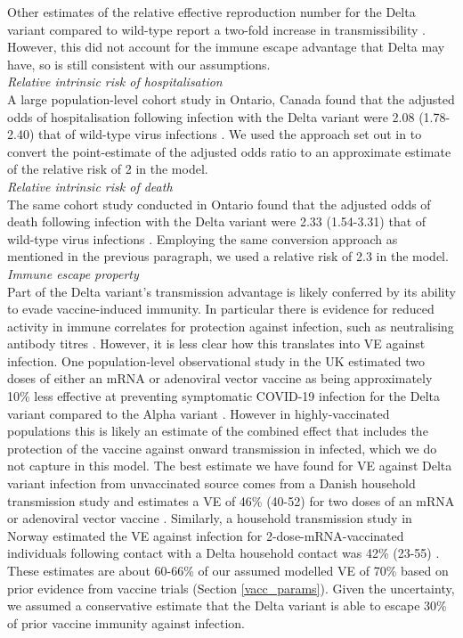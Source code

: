Other estimates of the relative effective reproduction number for the Delta variant compared to wild-type report a two-fold increase in transmissibility \cite{campbell2021}. 
However, this did not account for the immune escape advantage that Delta may have, so is still consistent with our assumptions.\\

\textit{Relative intrinsic risk of hospitalisation}\\
A large population-level cohort study in Ontario, Canada found that the adjusted odds of hospitalisation following infection with the Delta variant were 2.08 (1.78-2.40) that of 
wild-type virus infections \cite{fisman2021}. We used the approach set out in \cite{zhang1998} to convert the point-estimate of the adjusted odds ratio to an approximate estimate 
of the relative risk of 2 in the model.\\

\textit{Relative intrinsic risk of death}\\
The same cohort study conducted in Ontario found that the adjusted odds of death following infection with the Delta variant were 2.33 (1.54-3.31) that of wild-type virus infections \cite{fisman2021}. 
Employing the same conversion approach as mentioned in the previous paragraph, we used a relative risk of 2.3 in the model.\\

\textit{Immune escape property}\\
Part of the Delta variant's transmission advantage is likely conferred by its ability to evade vaccine-induced immunity. 
In particular there is evidence for reduced activity in immune correlates for protection against infection, such as neutralising 
antibody titres \cite{perezthen2022}. However, it is less clear how this translates into VE against infection. One population-level 
observational study in the UK estimated two doses of either an mRNA or adenoviral vector vaccine as being approximately 10\% less effective 
at preventing symptomatic COVID-19 infection for the Delta variant compared to the Alpha variant \cite{lopezbernal2021}. 
However in highly-vaccinated populations this is likely an estimate of the combined effect that includes the protection of the vaccine 
against onward transmission in infected, which we do not capture in this model. 
The best estimate we have found for VE against Delta variant infection from unvaccinated source comes from a Danish household transmission study and estimates a VE of 46\% (40-52) for two doses of an 
mRNA or adenoviral vector vaccine \cite{lyngse2022c}. 
Similarly, a household transmission study in Norway estimated the VE against infection for 
2-dose-mRNA-vaccinated individuals following contact with a Delta household contact was 42\% (23-55) \cite{jalili2022}. 
These estimates are about 60-66\% of our assumed modelled VE of 70\% based on prior evidence from vaccine trials (Section \ref{vacc_params}). 
Given the uncertainty, we assumed a conservative estimate that the Delta variant is able to escape 30\% of prior vaccine immunity against infection.


